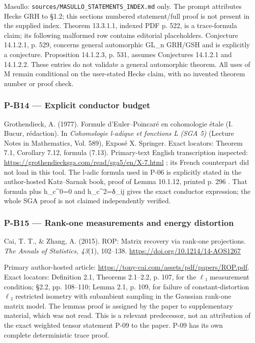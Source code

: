 \documentclass[11pt,a4paper]{article}
\theoremstyle{definition}\newtheorem{definition}{Definition}
\begin{document}
Masullo: \nolinkurl{sources/MASULLO_STATEMENTS_INDEX.md} only. The prompt
attributes Hecke GRH to §1.2; this section\textquotesingle s numbered
statement/full proof is not present in the supplied index. Theorem
13.3.1.1, indexed PDF p. 522, is a trace-formula claim; its following
malformed row contains editorial placeholders. Conjecture 14.1.2.1, p.
529, concerns general automorphic GL\_n GRH/GSH and is explicitly a
conjecture. Proposition 14.1.2.3, p. 531, assumes Conjectures 14.1.2.1
and 14.1.2.2. These entries do not validate a general automorphic
theorem. All uses of M remain conditional on the user-stated Hecke
claim, with no invented theorem number or proof check.

\subsubsection{P-B14 --- Explicit conductor
budget}\label{p-b14--explicit-conductor-budget}

Grothendieck, A. (1977). Formule d'Euler--Poincaré en cohomologie étale
(I. Bucur, rédaction). In \emph{Cohomologie l-adique et fonctions L (SGA
5)} (Lecture Notes in Mathematics, Vol. 589), Exposé X. Springer. Exact
locators: Theorem 7.1, Corollary 7.12, formula (7.13). Primary-text
English transcription inspected:
\url{https://grothendiecksga.com/read/sga5/en/X-7.html} ; its French
counterpart did not load in this tool. The l-adic formula used in P-06
is explicitly stated in the author-hosted Katz--Sarnak book, proof of
Lemma 10.1.12, printed p. 296 . That formula plus h\_c\^{}0=0 and
h\_c\^{}2=δ\_ij gives the exact conductor expression; the whole SGA
proof is not claimed independently verified.

\subsubsection{P-B15 --- Rank-one measurements and energy
distortion}\label{p-b15--rank-one-measurements-and-energy-distortion}

Cai, T. T., \& Zhang, A. (2015). ROP: Matrix recovery via rank-one
projections. \emph{The Annals of Statistics, 43}(1), 102--138.
\url{https://doi.org/10.1214/14-AOS1267}

Primary author-hosted article:
\url{https://tony-cai.com/assets/pdf/papers/ROP.pdf}. Exact locators:
Definition 2.1, Theorems 2.1--2.2, p. 107, for the \ensuremath{\ell}₁ measurement
condition; §2.2, pp. 108--110; Lemma 2.1, p. 109, for failure of
constant-distortion \ensuremath{\ell}₂ restricted isometry with subambient sampling in
the Gaussian rank-one matrix model. The lemma\textquotesingle s proof is
assigned by the paper to supplementary material, which was not read.
This is a relevant predecessor, not an attribution of the exact weighted
tensor statement P-09 to the paper. P-09 has its own complete
deterministic trace proof.
\end{document}
